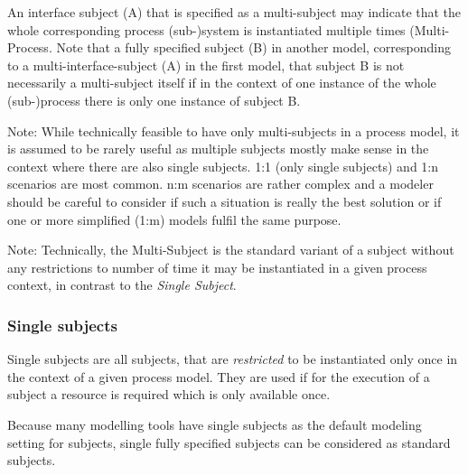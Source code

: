 

An interface subject (A) that is specified as a multi-subject may indicate that the whole corresponding process (sub-)system is instantiated multiple times (Multi-Process. Note that a fully specified subject (B) in another model, corresponding to a multi-interface-subject (A) in the first model, that  subject B is not necessarily a multi-subject itself if in the context of one instance of the whole (sub-)process there is only one instance of subject B. 

Note: While technically feasible to have only multi-subjects in a process model, it is assumed to be rarely useful as multiple subjects mostly make sense in the context where there are also single subjects. 1:1 (only single subjects) and 1:n scenarios are most common. n:m scenarios are rather complex and a modeler should be careful to consider if such a situation is really the best solution or if one or more simplified (1:m) models fulfil the same purpose.

Note: Technically, the Multi-Subject is the standard variant of a subject without any restrictions to number of time it may be instantiated in a given process context, in contrast to the \textit{Single Subject}.

\subsubsection{Single subjects}

Single subjects are all subjects, that are \textit{restricted} to be instantiated only once in the context of a given process model. They are used if for the execution of a subject a resource is required which is only available once.

Because many modelling tools have single subjects as the default modeling setting for subjects, single fully specified subjects can be considered as standard subjects.


